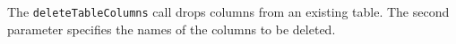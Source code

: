 The \verb+deleteTableColumns+ call drops columns from an existing table. The second parameter
specifies the names of the columns to be deleted.
